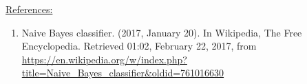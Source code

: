\documentclass[11pt]{article}
\begin{document}
\underline{References:}
\begin{enumerate}
\item Naive Bayes classifier. (2017, January 20). In Wikipedia, The Free Encyclopedia. Retrieved 01:02, February 22, 2017, from \url{https://en.wikipedia.org/w/index.php?title=Naive_Bayes_classifier&oldid=761016630}
\end{enumerate}
\end{document}
